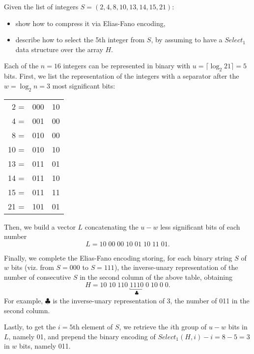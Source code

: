 \exercise

Given the list of integers $S=(2,4,8,10,13,14,15,21)$:
\begin{itemize}
  \item show how to compress it via Elias-Fano encoding,
  \item describe how to select the 5th integer from $S$, by assuming to have a $Select_1$ data structure over the array $H$.
\end{itemize}

\solution 
Each of the $n=16$ integers can be represented in binary with $u=\lceil\log_2 21\rceil=5$ bits. First, we list the representation of the integers with a separator after the $w=\log_2n=3$ most significant bits:
\begin{center}
  \begin{tabular}{ r || r | l }
     2 = & 000 & 10 \\ 
     4 = & 001 & 00 \\ 
     8 = & 010 & 00 \\
    10 = & 010 & 10 \\
    13 = & 011 & 01 \\
    14 = & 011 & 10 \\
    15 = & 011 & 11 \\
    21 = & 101 & 01
  \end{tabular}
\end{center}
Then, we build a vector  $L$ concatenating the $u-w$ less significant bits of each number
$$L = 10\; 00\; 00\; 10\; 01\; 10\; 11\; 01.$$ 

Finally, we complete the Elias-Fano encoding storing, for each binary string $S$ of $w$ bits (viz. from $S=000$ to $S=111$), the inverse-unary representation of the number of consecutive $S$ in the second column of the above table, obtaining
$$H=10\;10\;110\;\underbracket{1110}_{\clubsuit}\;0\;10\;0\;0.$$
For example, $\clubsuit$ is the inverse-unary representation of 3, the number of 011 in the second column.

Lastly, to get the $i=5$th element of $S$, we retrieve the $i$th group of $u-w$ bits in $L$, namely 01, and prepend the binary encoding of $Select_1(H, i)-i=8-5=3$ in $w$ bits, namely 011.